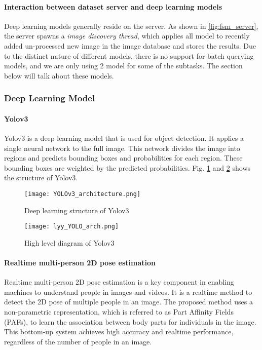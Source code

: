 \paragraph{Interaction between dataset server and deep learning models} Deep learning models generally reside on the server. As shown in \ref{fig:fsm_server}, the server spawns a \textit{image discovery thread}, which applies all model to recently added un-processed new image in the image database and stores the results. Due to the distinct nature of different models, there is no support for batch querying models, and we are only using 2 model for some of the subtasks. The section below will talk about these models.

\subsubsection{Deep Learning Model}

\paragraph{Yolov3} Yolov3 is a deep learning model that is used for object detection. It applies a single neural network to the full image. This network divides the image into regions and predicts bounding boxes and probabilities for each region. These bounding boxes are weighted by the predicted probabilities. Fig. \ref{fig:yolov3} and \ref{fig:yolov3_arch} shows the structure of Yolov3.

    \begin{figure}[h!]
        \centering \texttt{[image: YOLOv3\_architecture.png]}
        \caption{Deep learning structure of Yolov3}
        \label{fig:yolov3}
    \end{figure}
    
    
    \begin{figure}[h!]
        \centering \texttt{[image: lyy\_YOLO\_arch.png]}
        \caption{High level diagram of Yolov3}
        \label{fig:yolov3_arch}
    \end{figure}

\paragraph{Realtime multi-person 2D pose estimation} Realtime multi-person 2D pose estimation is a key component in enabling machines to understand people in images and videos. It is a realtime method to detect the 2D pose of multiple people in an image. The proposed method uses a non-parametric representation, which is referred to as Part Affinity Fields (PAFs), to learn the association between body parts for individuals in the image. This bottom-up system achieves high accuracy and realtime performance, regardless of the number of people in an image. \cite{zhu2013pedestrian}
    
